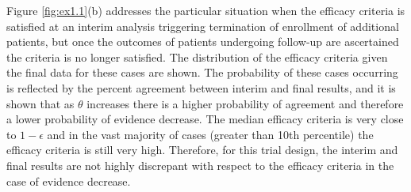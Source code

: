 \documentclass[useAMS,usenatbib,referee]{biom}
\begin{document}
Figure \ref{fig:ex1.1}(b) addresses the particular situation when the efficacy criteria  is satisfied at an interim analysis triggering termination of enrollment of additional patients, but once the outcomes of patients undergoing follow-up are ascertained the criteria is no longer satisfied. The distribution of the efficacy criteria given the final data for these cases are shown. The probability of these cases occurring is reflected by the percent agreement between interim and final results, and it is shown that as $\theta$ increases there is a higher probability of agreement and therefore a lower probability of evidence decrease.
%
The median efficacy criteria is very close to $1-\epsilon$ and in the vast majority of cases (greater than 10th percentile) the efficacy criteria is still very high. Therefore, for this trial design, the interim and final results are not highly discrepant with respect to the efficacy criteria in the case of evidence decrease.
\end{document}
